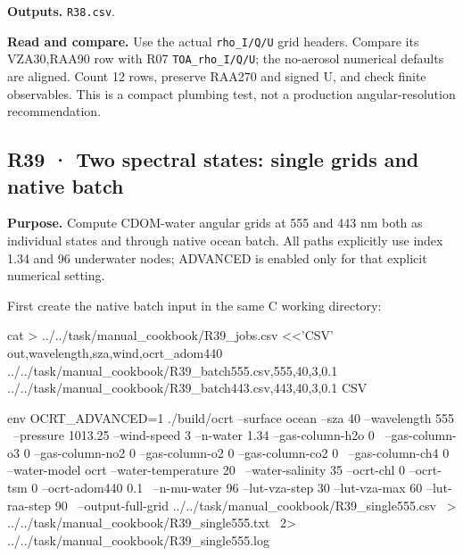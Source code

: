\textbf{Outputs. }\texttt{R38.csv}.

\textbf{Read and compare. }Use the actual \texttt{rho\_\allowbreak{}I/\allowbreak{}Q/\allowbreak{}U} grid headers. Compare its VZA30\textdegree{},RAA90\textdegree{} row with R07 \texttt{TOA\_\allowbreak{}rho\_\allowbreak{}I/\allowbreak{}Q/\allowbreak{}U}; the no-aerosol numerical defaults are aligned. Count 12 rows, preserve RAA270\textdegree{} and signed U, and check finite observables. This is a compact plumbing test, not a production angular-resolution recommendation.


\subsection{R39 · Two spectral states: single grids and native batch}
\label{sec:auto:09_cookbook:7.2}

\label{recipe:R39}

\textbf{Purpose. }Compute CDOM-water angular grids at 555 and 443 nm both as individual states and through native ocean batch. All paths explicitly use index 1.34 and 96 underwater nodes; ADVANCED is enabled only for that explicit numerical setting.

First create the native batch input in the same C working directory:

\noindent\begin{minipage}{\linewidth}
\begin{ManualCode}

cat > ../../task/manual_cookbook/R39_jobs.csv <<'CSV'
out,wavelength,sza,wind,ocrt_adom440
../../task/manual_cookbook/R39_batch555.csv,555,40,3,0.1
../../task/manual_cookbook/R39_batch443.csv,443,40,3,0.1
CSV

\end{ManualCode}
\end{minipage}\par

\noindent\begin{minipage}{\linewidth}
\begin{ManualCode}

env OCRT_ADVANCED=1 ./build/ocrt --surface ocean --sza 40 --wavelength 555 \
  --pressure 1013.25 --wind-speed 3 --n-water 1.34 --gas-column-h2o 0 \
  --gas-column-o3 0 --gas-column-no2 0 --gas-column-o2 0 --gas-column-co2 0 \
  --gas-column-ch4 0 --water-model ocrt --water-temperature 20 \
  --water-salinity 35 --ocrt-chl 0 --ocrt-tsm 0 --ocrt-adom440 0.1 \
  --n-mu-water 96 --lut-vza-step 30 --lut-vza-max 60 --lut-raa-step 90 \
  --output-full-grid ../../task/manual_cookbook/R39_single555.csv \
  > ../../task/manual_cookbook/R39_single555.txt \
  2> ../../task/manual_cookbook/R39_single555.log

\end{ManualCode}
\end{minipage}\par

